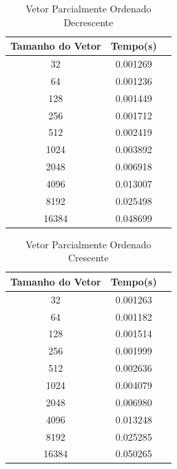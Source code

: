 \documentclass[12pt,a4paper,twoside]{report}
\begin{document}
\begin{table}[h]
  \centering
  \caption{Vetor Parcialmente Ordenado Decrescente \label{tab:pod}}
  \begin{tabular}{ccc} \\\hline
  \textbf{Tamanho do Vetor}  & \textbf{Tempo(s)} \\\hline
  32                              & 0.001269          \\\hline
  64                              & 0.001236          \\\hline
  128                             & 0.001449          \\\hline
  256                             & 0.001712          \\\hline
  512                             & 0.002419          \\\hline
  1024                            & 0.003892          \\\hline
  2048                            & 0.006918          \\\hline
  4096                            & 0.013007         \\\hline
  8192                            & 0.025498         \\\hline
  16384                           & 0.048699
  \\\hline
  \end{tabular}
\end{table}



\begin{table}[h]
  \centering
  \caption{Vetor Parcialmente Ordenado Crescente \label{tab:poc}}
  \begin{tabular}{ccc} \\\hline
  \textbf{Tamanho do Vetor}  & \textbf{Tempo(s)} \\\hline
  32                              & 0.001263          \\\hline
  64                              & 0.001182          \\\hline
  128                             & 0.001514          \\\hline
  256                             & 0.001999          \\\hline
  512                             & 0.002636          \\\hline
  1024                            & 0.004079          \\\hline
  2048                            & 0.006980          \\\hline
  4096                            & 0.013248
  \\\hline
  8192                            & 0.025285
  \\\hline
  16384                           & 0.050265
  \\\hline
  \end{tabular}
\end{table}
\end{document}
